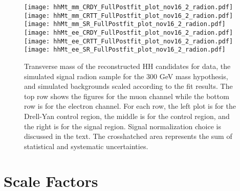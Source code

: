 \begin{figure}[tbp]
  \begin{center}
    \texttt{[image: hhMt\_mm\_CRDY\_FullPostfit\_plot\_nov16\_2\_radion.pdf]}
    \texttt{[image: hhMt\_mm\_CRTT\_FullPostfit\_plot\_nov16\_2\_radion.pdf]}
    \texttt{[image: hhMt\_mm\_SR\_FullPostfit\_plot\_nov16\_2\_radion.pdf]} \\
    \texttt{[image: hhMt\_ee\_CRDY\_FullPostfit\_plot\_nov16\_2\_radion.pdf]}
    \texttt{[image: hhMt\_ee\_CRTT\_FullPostfit\_plot\_nov16\_2\_radion.pdf]}
    \texttt{[image: hhMt\_ee\_SR\_FullPostfit\_plot\_nov16\_2\_radion.pdf]}
    \caption{Transverse mass of the reconstructed HH candidates for data, the simulated signal radion sample
    for the 300 GeV mass hypothesis, and simulated backgrounds scaled according to the fit results. The top
    row shows the figures for the muon channel while the bottom row is for the electron channel. For each row,
    the left plot is for the Drell-Yan control region, the middle is for the \ttbar control region, and the right
    is for the signal region. Signal normalization choice is discussed in the text. The crosshatched area represents
    the sum of statistical and systematic uncertainties.}
    \label{fig:MCcomparisons_radion}
%                                                                                                                 
  \end{center}
\end{figure}







\section{Scale Factors}

